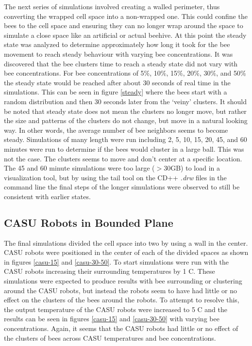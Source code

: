 \documentclass[conference,compsoc,onecolumn]{IEEEtran}
\begin{document}
The next series of simulations involved creating a walled perimeter, thus converting the wrapped cell space into a non-wrapped one. This could confine the bees to the cell space and ensuring they can no longer wrap around the space to simulate a close space like an artificial or actual beehive. At this point the steady state was analyzed to determine approximately how long it took for the bee movement to reach steady behaviour with varying bee concentrations. It was discovered that the bee clusters time to reach a steady state did not vary with bee concentrations. For bee concentrations of 5\%, 10\%, 15\%, 20\%, 30\%, and 50\% the steady state would be reached after about 30 seconds of real time in the simulations. This can be seen in figure \ref{steady} where the bees start with a random distribution and then 30 seconds later from the `veiny' clusters. It should be noted that steady state does not mean the clusters no longer move, but rather the size and patterns of the clusters do not change, but move in a natural looking way. In other words, the average number of bee neighbors seems to become steady.
Simulations of many length were run including 2, 5, 10, 15, 20, 45, and 60 minutes were run to determine if the bees would cluster in a large ball. This was not the case. The clusters seems to move and don't center at a specific location. The 45 and 60 minute simulations were too large ($>$30GB) to load in a visualization tool, but by using the tail tool on the CD++ \emph{.drw} files in the command line the final steps of the longer simulations were observed to still be consistent with earlier states.

\subsection{CASU Robots in Bounded Plane}

The final simulations divided the cell space into two by using a wall in the center. CASU robots were positioned in the center of each of the divided spaces as shown in figures \ref{casu-15} and \ref{casu-30-50}. To start simulations were run with the CASU robots increasing their surrounding temperatures by 1 \degree C. These simulations were expected to produce results with bee surrounding or clustering around the CASU robots, but instead the robots seem to have had little or no effect on the clusters of the bees around the robots. To attempt to resolve this, the output temperature of the CASU robots were increased to 5 \degree C and the results can be seen in figures \ref{casu-15} and \ref{casu-30-50} with varying bee concentrations. Again, it seems that the CASU robots had little or no effect of the clusters of bees across CASU temperatures and bee concentrations.
\end{document}
